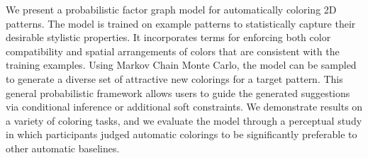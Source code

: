 We present a probabilistic factor graph model for automatically coloring 2D patterns. The model is trained on example patterns to statistically capture their desirable stylistic properties. It incorporates terms for enforcing both color compatibility and spatial arrangements of colors that are consistent with the training examples. Using Markov Chain Monte Carlo, the model can be sampled to generate a diverse set of attractive new colorings for a target pattern. This general probabilistic framework allows users to guide the generated suggestions via conditional inference or additional soft constraints. We demonstrate results on a variety of coloring tasks, and we evaluate the model through a perceptual study in which participants judged automatic colorings to be significantly preferable to other automatic baselines.